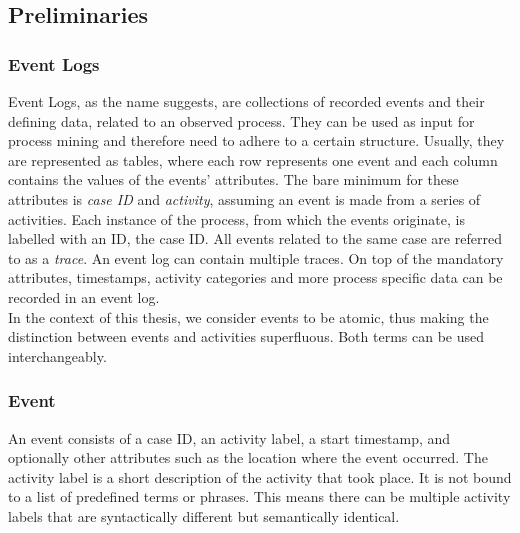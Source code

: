 \subsection{Preliminaries}\label{sec:back}
\subsubsection*{Event Logs}\label{sec:event-log}
Event Logs, as the name suggests, are collections of recorded events and their defining data, related to an observed process. They can be used as input for process mining and therefore need to adhere to a certain structure. Usually, they are represented as tables, where each row represents one event and each column contains the values of the events' attributes. The bare minimum for these attributes is \emph{case ID} and \emph{activity}, assuming an event is made from a series of activities. Each instance of the process, from which the events originate, is labelled with an ID, the case ID. All events related to the same case are referred to as a \emph{trace}. An event log can contain multiple traces. On top of the mandatory attributes, timestamps, activity categories and more process specific data can be recorded in an event log.~\cite{van_der_aalst_process_2016}\\
In the context of this thesis, we consider events to be atomic, thus making the distinction between events and activities superfluous. Both terms can be used interchangeably.

\subsubsection*{Event}\label{sec:event}
An event consists of a case ID, an activity label, a start timestamp, and optionally other attributes such as the location where the event occurred. The activity label is a short description of the activity that took place. It is not bound to a list of predefined terms or phrases. This means there can be multiple activity labels that are syntactically different but semantically identical.

